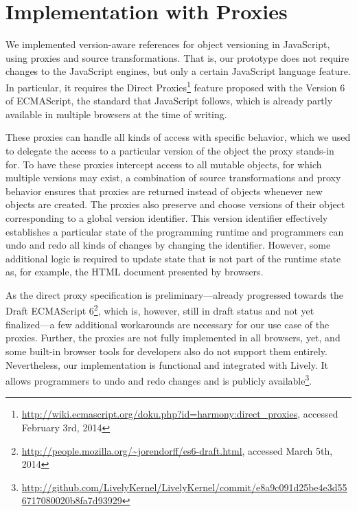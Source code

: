 \chapter{Implementation with Proxies} \label{chapter:IMPLEMENTATION}

We implemented version-aware references for object versioning in JavaScript, using proxies and source transformations.
That is, our prototype does not require changes to the JavaScript engines, but only a certain JavaScript language feature.
In particular, it requires the Direct Proxies\footnote{\url{http://wiki.ecmascript.org/doku.php?id=harmony:direct_proxies}, accessed February 3rd, 2014} feature proposed with the Version 6 of ECMAScript, the standard that JavaScript follows, which is already partly available in multiple browsers at the time of writing.

These proxies can handle all kinds of access with specific behavior, which we used to delegate the access to a particular version of the object the proxy stands-in for.
To have these proxies intercept access to all mutable objects, for which multiple versions may exist, a combination of source transformations and proxy behavior ensures that proxies are returned instead of objects whenever new objects are created.
The proxies also preserve and choose versions of their object corresponding to a global version identifier.
This version identifier effectively establishes a particular state of the programming runtime and programmers can undo and redo all kinds of changes by changing the identifier.
However, some additional logic is required to update state that is not part of the runtime state as, for example, the HTML document presented by browsers.

As the direct proxy specification is preliminary---already progressed towards the Draft ECMAScript 6\footnote{\url{http://people.mozilla.org/~jorendorff/es6-draft.html}, accessed March 5th, 2014}, which is, however, still in draft status and not yet finalized---a few additional workarounds are necessary for our use case of the proxies.
Further, the proxies are not fully implemented in all browsers, yet, and some built-in browser tools for developers also do not support them entirely.
Nevertheless, our implementation is functional and integrated with Lively.
It allows programmers to undo and redo changes and is publicly available\footnote{\url{http://github.com/LivelyKernel/LivelyKernel/commit/e8a9c091d25be4e3d556717080020b8fa7d93929}}.



